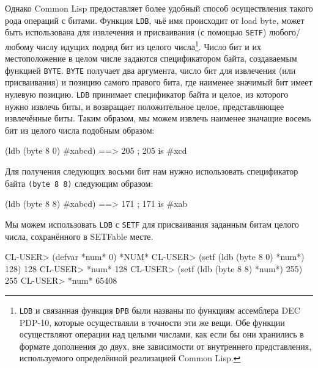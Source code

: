 Однако Common Lisp предоставляет более удобный способ осуществления такого рода операций
с битами. Функция \lstinline{LDB}, чьё имя происходит от load byte, может быть использована
для извлечения и присваивания (с помощью \lstinline{SETF}) любого/любому числу идущих подряд
бит из целого числа\footnote{\lstinline{LDB} и связанная функция \lstinline{DPB} были названы по
  функциям ассемблера DEC PDP-10, которые осуществляли в точности эти же вещи. Обе функции
  осуществляют операции над целыми числами, как если бы они хранились в формате дополнения
  до двух, вне зависимости от внутреннего представления, используемого определённой
  реализацией Common Lisp.}. Число бит и их местоположение в целом числе задаются
спецификатором байта, создаваемым функцией \lstinline{BYTE}. \lstinline{BYTE} получает два
аргумента, число бит для извлечения (или присваивания) и позицию самого правого бита, где
наименее значимый бит имеет нулевую позицию. \lstinline{LDB} принимает спецификатор байта и
целое, из которого нужно извлечь биты, и возвращает положительное целое, представляющее
извлечённые биты. Таким образом, мы можем извлечь наименее значащие восемь бит из целого
числа подобным образом:

\begin{myverb}
(ldb (byte 8 0) #xabcd) ==> 205 ; 205 is #xcd
\end{myverb}

Для получения следующих восьми бит нам нужно использовать спецификатор байта
\lstinline{(byte 8 8)} следующим образом:

\begin{myverb}
(ldb (byte 8 8) #xabcd) ==> 171 ; 171 is #xab
\end{myverb}

Мы можем использовать \lstinline{LDB} с \lstinline{SETF} для присваивания заданным битам целого
числа, сохранённого в SETFable месте.

\begin{myverb}
CL-USER> (defvar *num* 0)
*NUM*
CL-USER> (setf (ldb (byte 8 0) *num*) 128)
128
CL-USER> *num*
128
CL-USER> (setf (ldb (byte 8 8) *num*) 255)
255
CL-USER> *num*
65408
\end{myverb}

